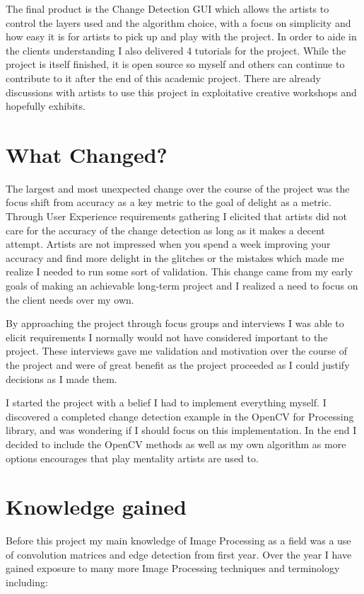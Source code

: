 \documentclass[a4paper]{report}
\begin{document}
The final product is the Change Detection GUI which allows the artists to control the layers used and the algorithm choice, with a focus on simplicity and how easy it is for artists to pick up and play with the project. In order to aide in the clients understanding I also delivered 4 tutorials for the project. While the project is itself finished, it is open source so myself and others can continue to contribute to it after the end of this academic project. There are already discussions with artists to use this project in exploitative creative workshops and hopefully exhibits.

\section{What Changed?}
The largest and most unexpected change over the course of the project was the focus shift from accuracy as a key metric to the goal of delight as a metric. Through User Experience requirements gathering I elicited that artists did not care for the accuracy of the change detection as long as it makes a decent attempt. Artists are not impressed when you spend a week improving your accuracy and find more delight in the glitches or the mistakes which made me realize I needed to run some sort of validation. This change came from my early goals of making an achievable long-term project and I realized a need to focus on the client needs over my own.

By approaching the project through focus groups and interviews I was able to elicit requirements I normally would not have considered important to the project. These interviews gave me validation and motivation over the course of the project and were of great benefit as the project proceeded as I could justify decisions as I made them.

I started the project with a belief I had to implement everything myself. I discovered a completed change detection example in the OpenCV for Processing \cite{OPENCV} library, and was wondering if I should focus on this implementation. In the end I decided to include the OpenCV methods as well as my own algorithm as more options encourages that play mentality artists are used to.

\section{Knowledge gained}
Before this project my main knowledge of Image Processing as a field was a use of convolution matrices and edge detection from first year. Over the year I have gained exposure to many more Image Processing techniques and terminology including:
\end{document}
